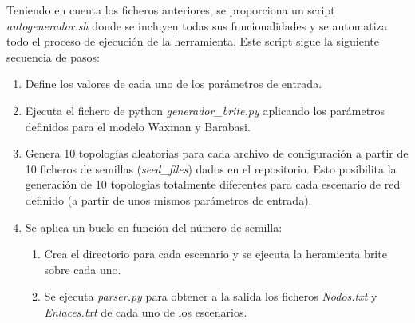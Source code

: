 \vspace{3mm}

Teniendo en cuenta los ficheros anteriores, se proporciona un script \textit{autogenerador.sh} donde se incluyen todas sus funcionalidades y se automatiza todo el proceso de ejecución de la herramienta. Este script sigue la siguiente secuencia de pasos:

\begin{enumerate}
    \item Define los valores de cada uno de los parámetros de entrada.
    \item Ejecuta el fichero de python \textit{generador\_brite.py} aplicando los parámetros definidos para el modelo Waxman y Barabasi.
    \item Genera 10 topologías aleatorias para cada archivo de configuración a partir de 10 ficheros de semillas (\textit{seed\_files}) dados en el repositorio. Esto posibilita la generación de 10 topologías totalmente diferentes para cada escenario de red definido (a partir de unos mismos parámetros de entrada). 
    \item Se aplica un bucle en función del número de semilla:
    \begin{enumerate} 
        \item Crea el directorio para cada escenario y se ejecuta la heramienta \gls{brite} sobre cada uno.
        \item Se ejecuta \textit{parser.py} para obtener a la salida los ficheros \textit{Nodos.txt} y \textit{Enlaces.txt} de cada uno de los escenarios.   
    \end{enumerate} 
\end{enumerate}
